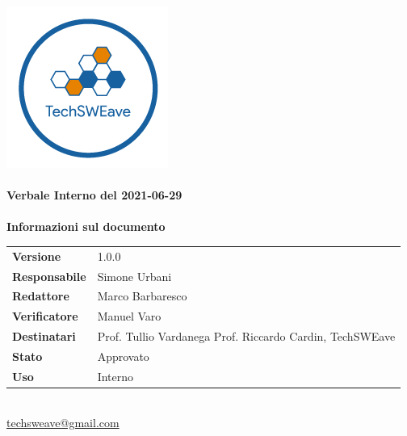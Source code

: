 \documentclass[a4paper]{article}
\begin{document}
\begin{titlepage}
    \begin{center}
        \includegraphics{../../../../Images/logo.png}\\
        \vspace{20px}
        \textcolor{logo}{\hrulefill}\\
        \vspace{20px}
        \textbf{\huge\textcolor{logo}{Verbale Interno del 2021-06-29}}\\
        \vspace{10px}
        \textcolor{logo}{\hrulefill}\\
        \vspace{40px}
        \textbf{\Large Informazioni sul documento}\\
        \vspace{20px}
        \begin{tabular}{p{100px} | p{100px}}
            \textbf{Versione}     & 1.0.0                                                                      \\
            \textbf{Responsabile} & Simone Urbani                                                              \\
            \textbf{Redattore}    & Marco Barbaresco                                                           \\
            \textbf{Verificatore} & Manuel Varo                                                                \\
            \textbf{Destinatari}  & Prof. Tullio Vardanega \newline Prof. Riccardo Cardin, \newline TechSWEave \\
            \textbf{Stato}        & Approvato                                                                  \\
            \textbf{Uso}          & Interno                                                                    \\
        \end{tabular}\\
        \vspace{60px}
        \href{mailto:techsweave@gmail.com}{techsweave@gmail.com}\\

    \end{center}
\end{titlepage}
\end{document}
